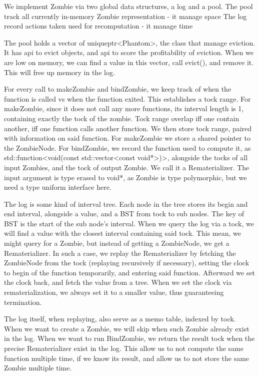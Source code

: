We implement Zombie via two global data structures, a log and a pool.
The pool track all currently in-memory Zombie representation - it manage space
The log record actions taken used for recomputation - it manage time

The pool holds a vector of uniqueptr<Phantom>, the class that manage eviction.
It has api to evict objects, and api to score the profitability of eviction.
When we are low on memory, we can find a value in this vector, call evict(), and remove it.
This will free up memory in the log.

For every call to makeZombie and bindZombie, we keep track of when the function is called vs when the function exited. This establishes a tock range. 
For makeZombie, since it does not call any more functions, its interval length is 1, containing exactly the tock of the zombie.
Tock range overlap iff one contain another, iff one function calls another function. We then store tock range, paired with information on said function. 
For makeZombie we store a shared pointer to the ZombieNode. 
For bindZombie, we record the function used to compute it, as std::function<void(const std::vector<const void*>)>, alongside the tocks of all input Zombies, and the tock of output Zombie. We call it a Rematerializer. The input argument is type erased to void*, as Zombie is type polymorphic, but we need a type uniform interface here.

The log is some kind of interval tree. Each node in the tree stores its begin and end interval, alongside a value, and a BST from tock to sub nodes. The key of BST is the start of the sub node’s interval. When we query the log via a tock, we will find a value with the closest interval containing said tock. This mean, we might query for a Zombie, but instead of getting a ZombieNode, we get a Rematerializer.
In such a case, we replay the Rematerializer by fetching the ZombieNode from the tock (replaying recursively if necessary), setting the clock to begin of the function temporarily, and entering said function. Afterward we set the clock back, and fetch the value from a tree.
When we set the clock via rematerialization, we always set it to a smaller value, thus guaranteeing termination.

The log itself, when replaying, also serve as a memo table, indexed by tock. When we want to create a Zombie, we will skip when such Zombie already exist in the log. When we want to run BindZombie, we return the result tock when the precise Rematerializer exist in the log. This allow us to not compute the same function multiple time, if we know its result, and allow us to not store the same Zombie multiple time.

